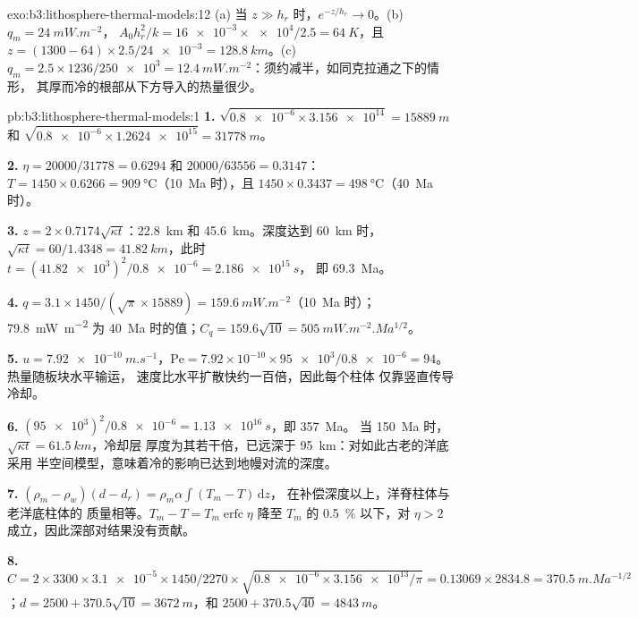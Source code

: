 \begin{solution}{exo:b3:lithosphere-thermal-models:12}
(a) 当 $z \gg h_r$ 时，$e^{-z/h_r} \to 0$。(b) $q_m = \qty{24}{mW.m^{-2}}$，
$A_0h_r^2/k = \num{16e-3}\times\num{e4}/2.5 = \qty{64}{K}$，且 $z = (1300 -
64)\times2.5/\num{24e-3} = \qty{128.8}{km}$。(c) $q_m = 2.5\times1236/\num{250e3}
= \qty{12.4}{mW.m^{-2}}$：须约减半，如同克拉通之下的情形，
其厚而冷的根部从下方导入的热量很少。
\end{solution}

\begin{solution}{pb:b3:lithosphere-thermal-models:1}
\textbf{1.} $\sqrt{\num{0.8e-6}\times\num{3.156e14}} = \qty{15889}{m}$ 和
$\sqrt{\num{0.8e-6}\times\num{1.2624e15}} = \qty{31778}{m}$。

\textbf{2.} $\eta = 20000/31778 = 0.6294$ 和 $20000/63556 = 0.3147$：
$T = 1450\times0.6266 = \qty{909}{\celsius}$（\qty{10}{Ma} 时），且
$1450\times0.3437 = \qty{498}{\celsius}$（\qty{40}{Ma} 时）。

\textbf{3.} $z = 2\times0.7174\sqrt{\kappa t}$：\qty{22.8}{km} 和
\qty{45.6}{km}。深度达到 \qty{60}{km} 时，$\sqrt{\kappa t} = 60/1.4348 =
\qty{41.82}{km}$，此时 $t = (\num{41.82e3})^2/\num{0.8e-6} = \qty{2.186e15}{s}$，
即 \qty{69.3}{Ma}。

\textbf{4.} $q = 3.1\times1450/(\sqrt\pi\times15889) = \qty{159.6}{mW.m^{-2}}$（\qty{10}{Ma} 时）；
\qty{79.8}{mW.m^{-2}} 为 \qty{40}{Ma} 时的值；$C_q = 159.6\sqrt{10}
= \qty{505}{mW.m^{-2}.Ma^{1/2}}$。

\textbf{5.} $u = \qty{7.92e-10}{m.s^{-1}}$，$\mathrm{Pe} = 7.92\times10^{-10}
\times\num{95e3}/\num{0.8e-6} = 94$。热量随板块水平输运，
速度比水平扩散快约一百倍，因此每个柱体
仅靠竖直传导冷却。

\textbf{6.} $(\num{95e3})^2/\num{0.8e-6} = \qty{1.13e16}{s}$，即 \qty{357}{Ma}。
当 \qty{150}{Ma} 时，$\sqrt{\kappa t} = \qty{61.5}{km}$，冷却层
厚度为其若干倍，已远深于 \qty{95}{km}：对如此古老的洋底采用
半空间模型，意味着冷的影响已达到地幔对流的深度。

\textbf{7.} $(\rho_m - \rho_w)(d - d_r) = \rho_m\alpha\int(T_m - T)\,\mathrm dz$，
在补偿深度以上，洋脊柱体与老洋底柱体的
质量相等。$T_m - T = T_m\operatorname{erfc}\eta$ 降至
$T_m$ 的 \qty{0.5}{\percent} 以下，对 $\eta > 2$ 成立，因此深部对结果没有贡献。

\textbf{8.} $C = 2\times3300\times\num{3.1e-5}\times1450/2270\times
\sqrt{\num{0.8e-6}\times\num{3.156e13}/\pi} = 0.13069\times2834.8 =
\qty{370.5}{m.Ma^{-1/2}}$；$d = 2500 + 370.5\sqrt{10} = \qty{3672}{m}$，和
$2500 + 370.5\sqrt{40} = \qty{4843}{m}$。


\end{solution}
